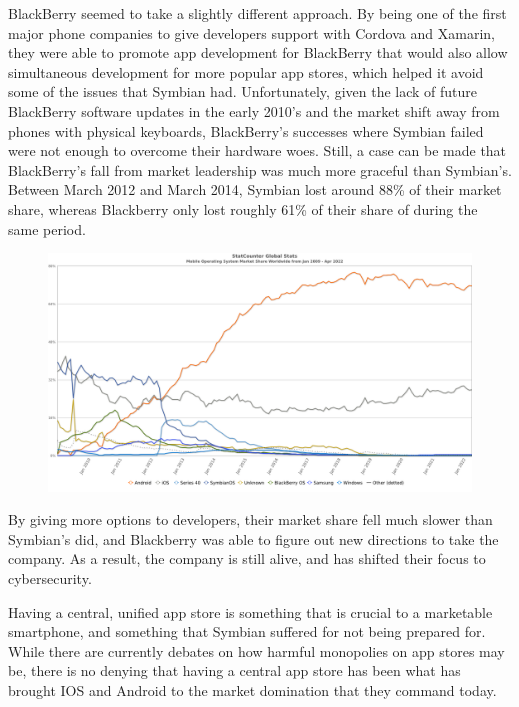 \documentclass{article}
\begin{document}
BlackBerry seemed to take a slightly different approach. By being one of the first major phone companies to give developers support with Cordova and Xamarin, they were able to promote app development for BlackBerry that would also allow simultaneous development for more popular app stores, which helped it avoid some of the issues that Symbian had.\cite{krishnan_2017} Unfortunately, given the lack of future BlackBerry software updates in the early 2010's and the market shift away from phones with physical keyboards, BlackBerry's successes where Symbian failed were not enough to overcome their hardware woes. Still, a case can be made that BlackBerry's fall from market leadership was much more graceful than Symbian's. Between March 2012 and March 2014, Symbian lost around 88\% of their market share, whereas Blackberry only lost roughly 61\% of their share of during the same period.\cite{statcounter_global_stats} 
\begin{figure}[h]
\centerline{\includegraphics[scale=.45]{StatCounter-os_global.png}}
\label{fig}
\end{figure}
By giving more options to developers, their market share fell much slower than Symbian's did, and Blackberry was able to figure out new directions to take the company. As a result, the company is still alive, and has shifted their focus to cybersecurity. 

Having a central, unified app store is something that is crucial to a marketable smartphone, and something that Symbian suffered for not being prepared for. While there are currently debates on how harmful monopolies on app stores may be, there is no denying that having a central app store has been what has brought IOS and Android to the market domination that they command today. 
\end{document}
